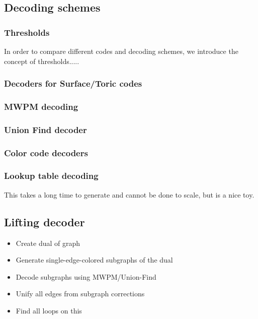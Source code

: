 \subsection{Decoding schemes}
\subsubsection{Thresholds}
In order to compare different codes and decoding schemes,
we introduce the concept of thresholds.....

\subsubsection{Decoders for Surface/Toric codes}
\subsubsection{MWPM decoding}
\subsubsection{Union Find decoder}

\subsubsection{Color code decoders}

\subsubsection{Lookup table decoding}
This takes a long time to generate and cannot be done to scale,
but is a nice toy.

\subsection{Lifting decoder}
\begin{itemize}
    \item Create dual of graph
    \item Generate single-edge-colored subgraphs of the dual
    \item Decode subgraphs using MWPM/Union-Find
    \item Unify all edges from subgraph corrections
    \item Find all loops on this
\end{itemize}
